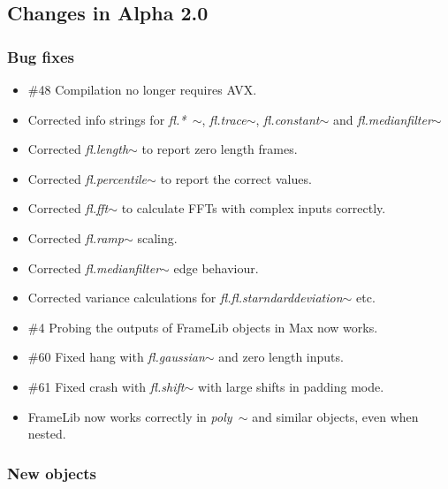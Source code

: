\documentclass{article}
\newcommand{\object}[1]{\textit{#1$\sim$}}
\newcommand{\flobject}[1]{\textit{fl.#1$\sim$}}
\begin{document}
\subsection{Changes in Alpha 2.0}
\vspace{0.1in}

\subsubsection{Bug fixes}

\begin{itemize}
\item {\#48} Compilation no longer requires AVX.
\item Corrected info strings for \flobject{*~},  \flobject{trace},  \flobject{constant} and  \flobject{medianfilter}
\item Corrected \flobject{length} to report zero length frames.
\item Corrected \flobject{percentile} to report the correct values.
\item Corrected \flobject{fft} to calculate FFTs with complex inputs correctly.
\item Corrected \flobject{ramp} scaling.
\item Corrected \flobject{medianfilter} edge behaviour.
\item Corrected variance calculations for  \flobject{fl.starndarddeviation} etc.
\item {\#4} Probing the outputs of FrameLib objects in Max now works.
\item {\#60} Fixed hang with \flobject{gaussian} and zero length inputs.
\item  {\#61} Fixed crash with \flobject{shift} with large shifts in padding mode.
\item FrameLib now works correctly in \object{poly~} and similar objects, even when nested.
\end{itemize}

\subsubsection{New objects}
\end{document}
